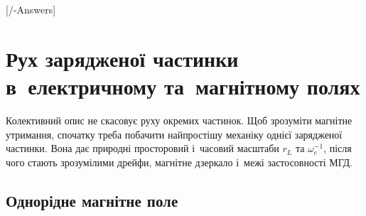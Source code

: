 

\graphicspath{{\currfilebase/Pictures}}

[\currfilebase/\currfilebase-Answers]
\chapter{Рух зарядженої частинки в~електричному та~магнітному полях}\label{sec:particle-motion}\hypertarget{particle-motion}{}

Колективний опис не скасовує руху окремих частинок. Щоб зрозуміти магнітне утримання,
спочатку треба побачити найпростішу механіку однієї зарядженої частинки. Вона дає природні
просторовий і~часовий масштаби $r_L$ та $\omega_c^{-1}$, після чого стають зрозумілими
дрейфи, магнітне дзеркало і~межі застосовності МГД.


\section{Однорідне магнітне поле}



